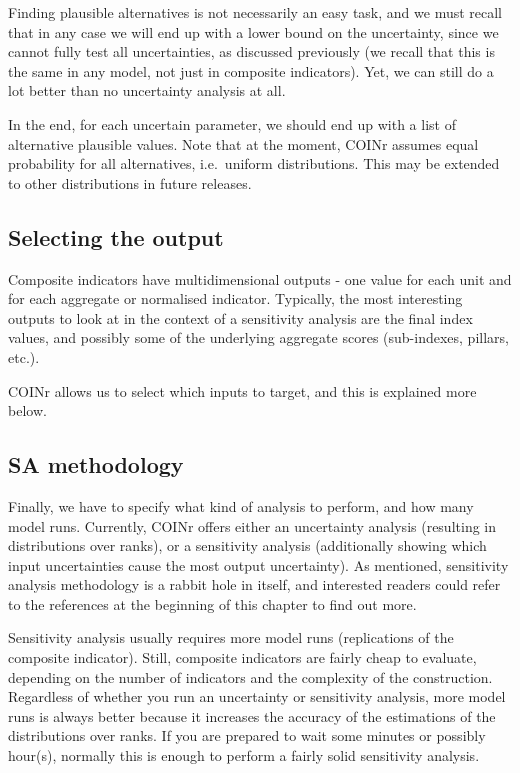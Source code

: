 \documentclass[
]{book}
\begin{document}
Finding plausible alternatives is not necessarily an easy task, and we must recall that in any case we will end up with a lower bound on the uncertainty, since we cannot fully test all uncertainties, as discussed previously (we recall that this is the same in any model, not just in composite indicators). Yet, we can still do a lot better than no uncertainty analysis at all.

In the end, for each uncertain parameter, we should end up with a list of alternative plausible values. Note that at the moment, COINr assumes equal probability for all alternatives, i.e.~uniform distributions. This may be extended to other distributions in future releases.

\hypertarget{selecting-the-output}{%
\subsection{Selecting the output}\label{selecting-the-output}}

Composite indicators have multidimensional outputs - one value for each unit and for each aggregate or normalised indicator. Typically, the most interesting outputs to look at in the context of a sensitivity analysis are the final index values, and possibly some of the underlying aggregate scores (sub-indexes, pillars, etc.).

COINr allows us to select which inputs to target, and this is explained more below.

\hypertarget{sa-methodology}{%
\subsection{SA methodology}\label{sa-methodology}}

Finally, we have to specify what kind of analysis to perform, and how many model runs. Currently, COINr offers either an uncertainty analysis (resulting in distributions over ranks), or a sensitivity analysis (additionally showing which input uncertainties cause the most output uncertainty). As mentioned, sensitivity analysis methodology is a rabbit hole in itself, and interested readers could refer to the references at the beginning of this chapter to find out more.

Sensitivity analysis usually requires more model runs (replications of the composite indicator). Still, composite indicators are fairly cheap to evaluate, depending on the number of indicators and the complexity of the construction. Regardless of whether you run an uncertainty or sensitivity analysis, more model runs is always better because it increases the accuracy of the estimations of the distributions over ranks. If you are prepared to wait some minutes or possibly hour(s), normally this is enough to perform a fairly solid sensitivity analysis.
\end{document}
